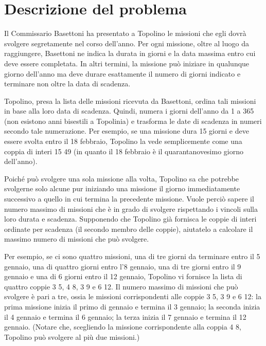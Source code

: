 \documentclass[a4paper,11pt]{article}
\begin{document}
\vspace{0.5cm}



\vspace{0.5cm}

\section*{Descrizione del problema}
   
Il Commissario Basettoni ha presentato a Topolino le missioni che egli
dovrà svolgere segretamente nel corso dell'anno. Per ogni
missione, oltre al luogo da raggiungere, Basettoni ne indica la durata
in giorni e la data massima entro cui deve essere completata. In altri
termini, la missione può iniziare in qualunque giorno dell'anno
ma deve durare esattamente il numero di giorni indicato e terminare
non oltre la data di scadenza.

Topolino, presa la lista delle missioni ricevuta da Basettoni, ordina
tali missioni in base alla loro data di scadenza.  Quindi, numera i
giorni dell'anno da 1 a 365 (non esistono anni bisestili a Topolinia)
e trasforma le date di scadenza in numeri secondo tale numerazione.
Per esempio, se una missione dura 15 giorni e deve essere svolta entro
il 18 febbraio, Topolino la vede semplicemente come una coppia di
interi 15  49 (in quanto il 18 febbraio è il quarantanovesimo
giorno dell'anno).

Poiché può svolgere una sola missione alla volta,
Topolino sa che potrebbe svolgerne solo alcune pur iniziando una
missione il giorno immediatamente successivo a quello in cui termina
la precedente missione. Vuole perciò sapere il numero massimo
di missioni che è in grado di svolgere rispettando i vincoli
sulla loro durata e scadenza.  Supponendo che Topolino già
fornisca le coppie di interi ordinate per scadenza (il secondo membro
delle coppie), aiutatelo a calcolare il massimo numero di missioni che
può svolgere.

Per esempio, se ci sono quattro missioni, una di tre giorni da
terminare entro il 5 gennaio, una di quattro giorni entro l'8 gennaio,
una di tre giorni entro il 9 gennaio e una di 6 giorni entro il 12
gennaio, Topolino vi fornisce la lista di quattro coppie 3 5, 4 8, 3 9
e 6 12. Il numero massimo di missioni che può svolgere è
pari a tre, ossia le missioni corrispondenti alle coppie 3 5, 3 9 e 6
12: la prima missione inizia il primo di gennaio e termina il 3
gennaio; la seconda inizia il 4 gennaio e termina il 6 gennaio; la
terza inizia il 7 gennaio e termina il 12 gennaio. (Notare che,
scegliendo la missione corrispondente alla coppia 4 8, Topolino
può svolgere al più due missioni.)
\end{document}
